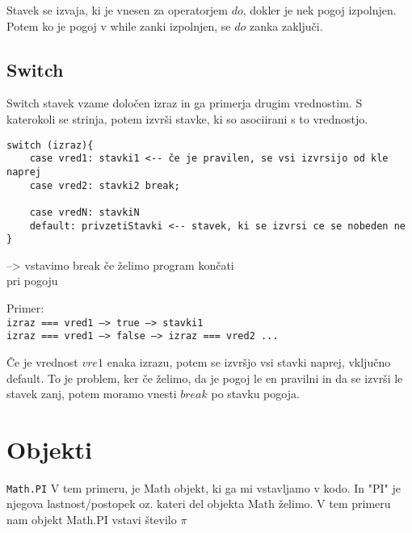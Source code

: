 {\centering{}\par}

Stavek se izvaja, ki je vnesen za operatorjem $do$, dokler je nek pogoj izpolnjen. Potem ko je pogoj v while zanki izpolnjen, se $do$ zanka zaključi.

\subsection{Switch}
Switch stavek vzame določen izraz in ga primerja drugim vrednostim. S katerokoli se strinja, potem izvrši stavke, ki so asociirani s to vrednostjo.
\begin{verbatim}
switch (izraz){
    case vred1: stavki1 <-- če je pravilen, se vsi izvrsijo od kle naprej
    case vred2: stavki2 break;
    
    case vredN: stavkiN
    default: privzetiStavki <-- stavek, ki se izvrsi ce se nobeden ne
}
\end{verbatim}
 --> vstavimo break če želimo program končati\\ pri pogoju

Primer:\\
\texttt{izraz === vred1 --> true --> stavki1}\\
\texttt{izraz === vred1 --> false --> izraz === vred2 ...}

Če je vrednost $vre1$ enaka izrazu, potem se izvršjo vsi stavki naprej, vključno default. To je problem, ker če želimo, da je pogoj le en pravilni in da se izvrši le stavek zanj, potem moramo vnesti $break$ po stavku pogoja.
\newpage
\section{Objekti}

\texttt{Math.PI}
V tem primeru, je Math objekt, ki ga mi vstavljamo v kodo. In "PI" je njegova lastnost/postopek oz. kateri del objekta Math želimo. V tem primeru nam objekt Math.PI vstavi število $\pi$


